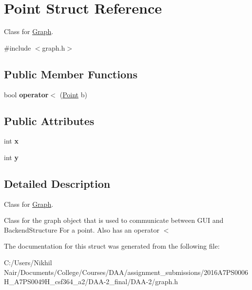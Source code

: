 \hypertarget{struct_point}{}\section{Point Struct Reference}
\label{struct_point}


Class for \mbox{\hyperlink{class_graph}{Graph}}.  




{\ttfamily \#include $<$graph.\+h$>$}

\subsection*{Public Member Functions}
\begin{DoxyCompactItemize}
\item 
\mbox{\label{struct_point_a779d9218c12929c17afdec20d08e6623}} 
bool {\bfseries operator$<$} (\mbox{\hyperlink{struct_point}{Point}} b)
\end{DoxyCompactItemize}
\subsection*{Public Attributes}
\begin{DoxyCompactItemize}
\item 
\mbox{\label{struct_point_a8c779e11e694b20e0946105a9f5de842}} 
int {\bfseries x}
\item 
\mbox{\label{struct_point_a2e1b5fb2b2a83571f5c0bc0f66a73cf7}} 
int {\bfseries y}
\end{DoxyCompactItemize}


\subsection{Detailed Description}
Class for \mbox{\hyperlink{class_graph}{Graph}}. 

Class for the graph object that is used to communicate between G\+UI and Backend\+Structure For a point. Also has an operator $<$ 

The documentation for this struct was generated from the following file\+:\begin{DoxyCompactItemize}
\item 
C\+:/\+Users/\+Nikhil Nair/\+Documents/\+College/\+Courses/\+D\+A\+A/assignment\+\_\+submissions/2016\+A7\+P\+S0006\+H\+\_\+A7\+P\+S0049\+H\+\_\+csf364\+\_\+a2/\+D\+A\+A-\/2\+\_\+final/\+D\+A\+A-\/2/graph.\+h\end{DoxyCompactItemize}
